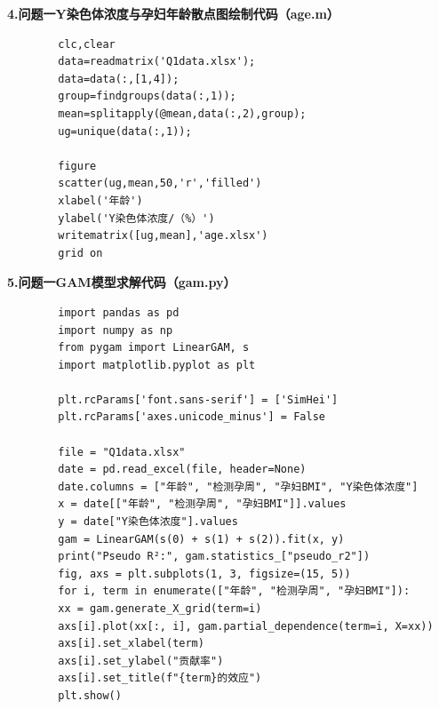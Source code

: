 \documentclass[12pt]{ctexart}
\begin{document}
	\noindent \textbf{\heiti 4.问题一Y染色体浓度与孕妇年龄散点图绘制代码（age.m）}
	\begin{verbatim}
		clc,clear
		data=readmatrix('Q1data.xlsx');
		data=data(:,[1,4]);
		group=findgroups(data(:,1));
		mean=splitapply(@mean,data(:,2),group);
		ug=unique(data(:,1));
		
		figure
		scatter(ug,mean,50,'r','filled')
		xlabel('年龄')
		ylabel('Y染色体浓度/（%）')
		writematrix([ug,mean],'age.xlsx')
		grid on
	\end{verbatim}
	
	\noindent \textbf{\heiti 5.问题一GAM模型求解代码（gam.py）}
	\begin{verbatim}
		import pandas as pd
		import numpy as np
		from pygam import LinearGAM, s
		import matplotlib.pyplot as plt
		
		plt.rcParams['font.sans-serif'] = ['SimHei']  
		plt.rcParams['axes.unicode_minus'] = False
		
		file = "Q1data.xlsx"
		date = pd.read_excel(file, header=None)
		date.columns = ["年龄", "检测孕周", "孕妇BMI", "Y染色体浓度"]
		x = date[["年龄", "检测孕周", "孕妇BMI"]].values
		y = date["Y染色体浓度"].values
		gam = LinearGAM(s(0) + s(1) + s(2)).fit(x, y)
		print("Pseudo R²:", gam.statistics_["pseudo_r2"])
		fig, axs = plt.subplots(1, 3, figsize=(15, 5))
		for i, term in enumerate(["年龄", "检测孕周", "孕妇BMI"]):
		xx = gam.generate_X_grid(term=i)
		axs[i].plot(xx[:, i], gam.partial_dependence(term=i, X=xx))
		axs[i].set_xlabel(term)
		axs[i].set_ylabel("贡献率")
		axs[i].set_title(f"{term}的效应")
		plt.show()
		
	\end{verbatim}
	
\end{document}
